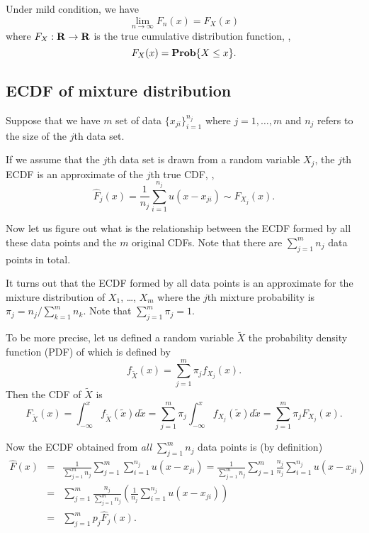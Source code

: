 Under mild condition, we have
\begin{equation}
\lim_{n\to\infty} F_n(x) = F_X(x)
\end{equation}
where $F_X:\mathbf{R}\to\mathbf{R}$ is the true cumulative distribution function,
\ie,
\begin{equation}
F_X(x) = \mathop{\bf Prob}\{X\leq x\}.
\end{equation}

\subsection{ECDF of mixture distribution}

Suppose that we have $m$ set of data $\{x_{ji}\}_{i=1}^{n_j}$
where $j=1,\ldots, m$ and $n_j$ refers to the size of the $j$th data set.

If we assume that the $j$th data set is drawn from a random variable $X_j$,
the $j$th ECDF is an approximate of the $j$th true CDF,
\ie,
\begin{equation}
\hat{F}_j(x) = \frac{1}{n_j} \sum_{i=1}^{n_j} u(x-x_{ji})
\sim F_{X_j}(x).
\end{equation}

Now let us figure out what is the relationship between the ECDF formed by all these data points
and the $m$ original CDFs.
Note that there are $\sum_{j=1}^m n_j$ data points in total.

It turns out that the ECDF formed by all data points is an approximate for the mixture distribution
of $X_1$, \ldots, $X_m$
where the $j$th mixture probability is $\pi_j = n_j / \sum_{k=1}^m n_k$.
Note that $\sum_{j=1}^m \pi_j = 1$.

To be more precise, let us defined a random variable $\tilde{X}$
the probability density function (PDF) of which is defined by
\begin{equation}
\label{eq:gyusj}
f_{\tilde{X}}(x) = \sum_{j=1}^m \pi_j f_{X_j}(x).
\end{equation}
Then the CDF of $\tilde{X}$ is
\begin{equation}
F_{\tilde{X}}(x)
= \int_{-\infty}^x f_{\tilde{X}}(\tilde{x}) d\tilde{x}
= \sum_{j=1}^m \pi_j \int_{-\infty}^x f_{X_j}(\tilde{x}) d\tilde{x}
= \sum_{j=1}^m \pi_j F_{X_j}(x).
\end{equation}

Now the ECDF obtained from \emph{all} $\sum_{j=1}^m n_j$ data points is (by definition)
\begin{eqnarray*}
\hat{F}(x) &=& \frac{1}{\sum_{j=1}^m n_j} \sum_{j=1}^m \sum_{i=1}^{n_j} u(x-x_{ji})
= \frac{1}{\sum_{j=1}^m n_j} \sum_{j=1}^m \frac{n_j}{n_j} \sum_{i=1}^{n_j} u(x-x_{ji})
\\
&=&
\sum_{j=1}^m \frac{n_j}{\sum_{j=1}^m n_j} \left( \frac{1}{n_j} \sum_{i=1}^{n_j} u(x-x_{ji}) \right)
\\
&=&
\sum_{j=1}^m p_j \hat{F}_j(x).
\end{eqnarray*}

